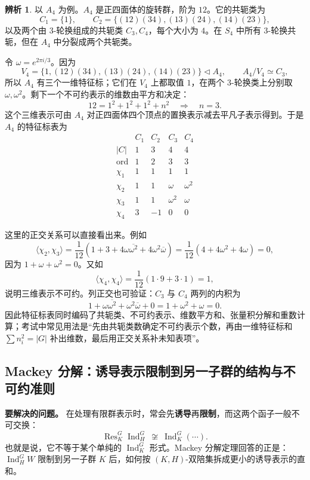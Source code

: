\documentclass[a4paper]{ctexart}
\theoremstyle{definition}
\theoremstyle{analysis}
\newtheorem{remark}{辨析}[section]
\theoremstyle{plain}
\begin{document}
\begin{remark}
\label{rem:a4-character-table}
以 \(A_4\) 为例。\(A_4\) 是正四面体的旋转群，阶为 \(12\)。它的共轭类为
\[
  C_1=\{1\},\qquad
  C_2=\{(12)(34),(13)(24),(14)(23)\},
\]
以及两个由 \(3\)-轮换组成的共轭类 \(C_3,C_4\)，每个大小为 \(4\)。在 \(S_4\) 中所有 \(3\)-轮换共轭，但在 \(A_4\) 中分裂成两个共轭类。

令 \(\omega=e^{2\pi i/3}\)。因为
\[
  V_4=\{1,(12)(34),(13)(24),(14)(23)\}\triangleleft A_4,
  \qquad A_4/V_4\simeq C_3,
\]
所以 \(A_4\) 有三个一维特征标；它们在 \(V_4\) 上都取值 \(1\)，在两个 \(3\)-轮换类上分别取 \(\omega,\omega^2\)。剩下一个不可约表示的维数由平方和决定：
\[
  12=1^2+1^2+1^2+n^2
  \quad\Rightarrow\quad n=3.
\]
这个三维表示可由 \(A_4\) 对正四面体四个顶点的置换表示减去平凡子表示得到。于是 \(A_4\) 的特征标表为
\[
\begin{array}{c|cccc}
 & C_1 & C_2 & C_3 & C_4\\
\hline
|C| & 1 & 3 & 4 & 4\\
\operatorname{ord} & 1 & 2 & 3 & 3\\
\hline
\chi_1 & 1 & 1 & 1 & 1\\
\chi_2 & 1 & 1 & \omega & \omega^2\\
\chi_3 & 1 & 1 & \omega^2 & \omega\\
\chi_4 & 3 & -1 & 0 & 0
\end{array}
\]

这里的正交关系可以直接看出来。例如
\[
  \langle \chi_2,\chi_3\rangle
  =
  \frac1{12}\left(1+3+4\omega\overline{\omega^2}
  +4\omega^2\overline{\omega}\right)
  =
  \frac1{12}\left(4+4\omega^2+4\omega\right)=0,
\]
因为 \(1+\omega+\omega^2=0\)。又如
\[
  \langle \chi_4,\chi_4\rangle
  =
  \frac1{12}\left(1\cdot 9+3\cdot 1\right)=1,
\]
说明三维表示不可约。列正交也可验证：\(C_3\) 与 \(C_4\) 两列的内积为
\[
  1+\omega\overline{\omega^2}+\omega^2\overline{\omega}+0
  =
  1+\omega^2+\omega=0.
\]
因此特征标表同时编码了共轭类、不可约表示、维数平方和、张量积分解和重数计算；考试中常见用法是“先由共轭类数确定不可约表示个数，再由一维特征标和 \(\sum n_i^2=|G|\) 补出维数，最后用正交关系补未知表项”。
\end{remark}

\subsection{Mackey 分解：诱导表示限制到另一子群的结构与不可约准则}\label{subsec:mackey-decomposition}

\textbf{要解决的问题。} 在处理有限群表示时，常会先\textbf{诱导}再\textbf{限制}，而这两个函子一般不可交换：
\[
  \operatorname{Res}_K^G\operatorname{Ind}_H^G\ \not\cong\ \operatorname{Ind}_K^G(\cdots).
\]
也就是说，它不等于某个单纯的 \(\operatorname{Ind}_K^G\) 形式。Mackey 分解定理回答的正是：\(\operatorname{Ind}_H^G W\) 限制到另一子群 \(K\) 后，如何按 \((K,H)\)-双陪集拆成更小的诱导表示的直和。
\end{document}
